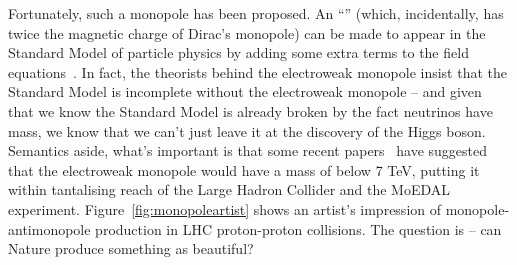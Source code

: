 Fortunately, such a monopole has been proposed.
An ``'' (which, incidentally, has twice the
magnetic charge of Dirac's monopole) can be made to appear in the
Standard Model of particle physics by adding some extra terms to the
field equations~\cite{Cho1997,Yang1998}.
In fact, the theorists behind the electroweak monopole insist that the
Standard Model is incomplete without the electroweak monopole -- and
given that we know the Standard Model is already broken
by the fact neutrinos have mass, we know that we can't just leave it at
the discovery of the Higgs boson.
%
Semantics aside, what's important is that some
recent papers~\cite{Kimm2016,Ellis2016} have suggested that the
electroweak monopole would have a mass of below 7 \acs{TeV},
putting it within tantalising reach of the Large Hadron Collider and
the MoEDAL experiment.
%
Figure~\ref{fig:monopoleartist} shows an artist's impression of
monopole-antimonopole production in \acs{LHC} proton-proton collisions.
%
The question is -- can Nature produce something as beautiful?
